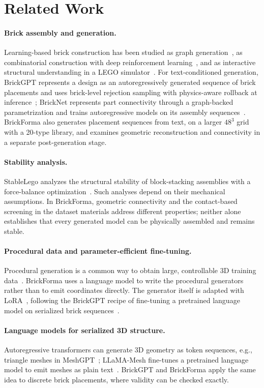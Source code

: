 \documentclass[letterpaper]{article} %
\begin{document}
\section{Related Work}
\paragraph{Brick assembly and generation.}
Learning-based brick construction has been studied as graph generation~\cite{thompson2020lego}, as combinatorial construction with deep reinforcement learning~\cite{brickbybrick}, and as interactive structural understanding in a LEGO simulator~\cite{breakandmake}. For text-conditioned generation, BrickGPT represents a design as an autoregressively generated sequence of brick placements and uses brick-level rejection sampling with physics-aware rollback at inference~\cite{brickgpt}; BrickNet represents part connectivity through a graph-backed parametrization and trains autoregressive models on its assembly sequences~\cite{bricknet}. BrickForma also generates placement sequences from text, on a larger $48^3$ grid with a 20-type library, and examines geometric reconstruction and connectivity in a separate post-generation stage.

\paragraph{Stability analysis.}
StableLego analyzes the structural stability of block-stacking assemblies with a force-balance optimization~\cite{stablelego}. Such analyses depend on their mechanical assumptions. In BrickForma, geometric connectivity and the contact-based screening in the dataset materials address different properties; neither alone establishes that every generated model can be physically assembled and remains stable.

\paragraph{Procedural data and parameter-efficient fine-tuning.}
Procedural generation is a common way to obtain large, controllable 3D training data~\cite{infinigen}. BrickForma uses a language model to write the procedural generators rather than to emit coordinates directly. The generator itself is adapted with LoRA~\cite{lora}, following the BrickGPT recipe of fine-tuning a pretrained language model on serialized brick sequences~\cite{brickgpt}.

\paragraph{Language models for serialized 3D structure.}
Autoregressive transformers can generate 3D geometry as token sequences, e.g., triangle meshes in MeshGPT~\cite{meshgpt}; LLaMA-Mesh fine-tunes a pretrained language model to emit meshes as plain text~\cite{llamamesh}. BrickGPT and BrickForma apply the same idea to discrete brick placements, where validity can be checked exactly.
\end{document}
